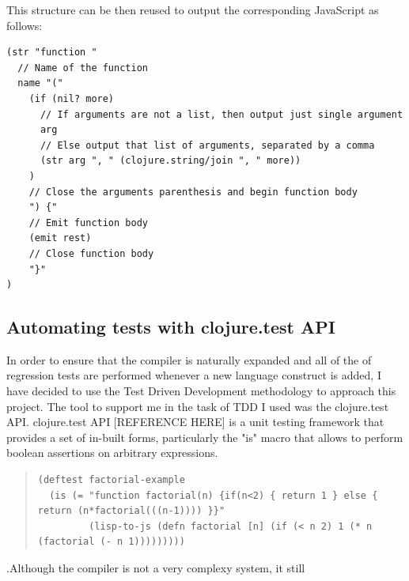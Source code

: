 This structure can be then reused to output the corresponding JavaScript as follows:

\begin{verbatim}
(str "function "
  // Name of the function 
  name "("
    (if (nil? more) 
      // If arguments are not a list, then output just single argument
      arg 
      // Else output that list of arguments, separated by a comma
      (str arg ", " (clojure.string/join ", " more))
    )
    // Close the arguments parenthesis and begin function body
    ") {"
    // Emit function body
    (emit rest)
    // Close function body
    "}"
)
\end{verbatim}

\subsection{Automating tests with clojure.test API}
In order to ensure that the compiler is naturally expanded and all of the of regression tests are performed whenever a new language construct is added, I have decided to use the Test Driven Development methodology to approach this project. 
The tool to support me in the task of TDD I used was the clojure.test API.
clojure.test API [REFERENCE HERE] is a unit testing framework that provides a set of in-built forms, particularly the "is" macro that allows to perform boolean assertions on arbitrary expressions. 

\begin{quote}
\begin{verbatim}
(deftest factorial-example
  (is (= "function factorial(n) {if(n<2) { return 1 } else { return (n*factorial(((n-1)))) }}"
         (lisp-to-js (defn factorial [n] (if (< n 2) 1 (* n (factorial (- n 1)))))))))
\end{verbatim}
\end{quote}

.Although the compiler is not a very complexy system, it still 